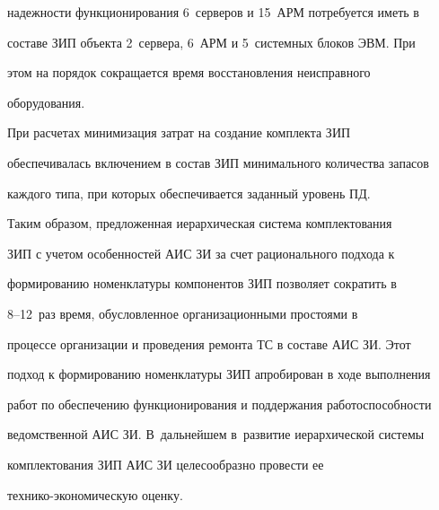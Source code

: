 надежности функционирования 6~серверов и 15~АРМ потребуется иметь в

составе ЗИП объекта 2~сервера, 6~АРМ и 5~системных блоков ЭВМ. При

этом на порядок сокращается время восстановления неисправного

оборудования.



     При расчетах минимизация затрат на создание комплекта ЗИП

обеспечивалась включением в состав ЗИП минимального количества запасов

каждого типа, при которых обеспечивается заданный уровень ПД.



     Таким образом, предложенная иерархическая система комплектования

ЗИП с учетом особенностей АИС ЗИ за счет рационального подхода к

формированию номенклатуры компонентов ЗИП позволяет сократить в

     8--12~раз время, обусловленное организационными простоями в

процессе организации и проведения ремонта ТС в составе АИС ЗИ. Этот

подход к формированию номенклатуры ЗИП апробирован в ходе выполнения

работ по обеспечению функционирования и поддержания работоспособности

ведомственной АИС ЗИ. В~дальнейшем в~развитие иерархической системы

комплектования ЗИП АИС ЗИ целесообразно провести ее

     тех\-ни\-ко-эко\-но\-ми\-че\-скую оценку.



